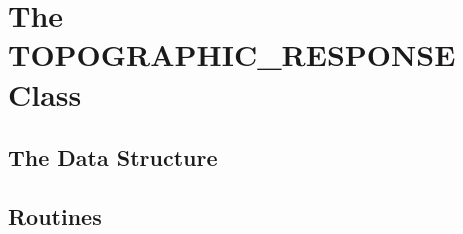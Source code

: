 \documentclass[12pt]{memoir}
\begin{document}
\chapter{The TOPOGRAPHIC\_RESPONSE Class}\label{chap:Class}

  \section{The Data Structure}

  \section{Routines}
  
  
\pagebreak


\end{document}
